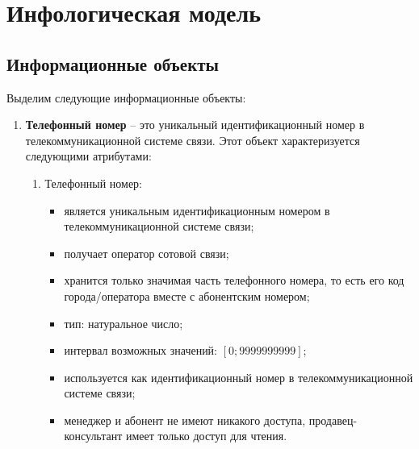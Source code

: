 \section{Инфологическая модель}\label{sec:infological-model}

\subsection{Информационные объекты}\label{subsec:information-objects}

\newcommand{\img}[2]{
    \begin{figure}[H]
        \label{fig:#1}
        \center{\texttt{[image: graphics/\#1]}}
        \caption{#2}
    \end{figure}
}

Выделим следующие информационные объекты:
\begin{enumerate}
    \item \textbf{Телефонный номер} -- это уникальный идентификационный номер в телекоммуникационной системе связи. Этот объект характеризуется следующими атрибутами:
    \begin{enumerate}
        \item Телефонный номер:
        \begin{itemize}
            \item является уникальным идентификационным номером в телекоммуникационной системе связи;
            \item получает оператор сотовой связи;
            \item хранится только значимая часть телефонного номера, то есть его код города/оператора вместе с абонентским номером;
            \item тип: натуральное число;
            \item интервал возможных значений: $[0; 9 999 999 999]$;
            \item используется как идентификационный номер в телекоммуникационной системе связи;
            \item менеджер и абонент не имеют никакого доступа, продавец-консультант имеет только доступ для чтения.
        \end{itemize}


\end{enumerate}
\end{enumerate}
